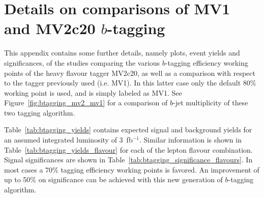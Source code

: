\clearpage 
\section{Details on comparisons of MV1 and MV2c20 $b$-tagging}
\label{app_btagging}

This appendix contains some further details, namely plots, event yields and significances, of the studies comparing the various $b$-tagging efficiency working points of the heavy flavour tagger MV2c20, 
as well as a comparison with respect to the tagger previously used (i.e. MV1).
In this latter case only the default 80\% working point is used, and is simply labeled as MV1. See Figure~\ref{fig:btagging_mv2_mv1} for a comparison of $b$-jet multiplicity of these two tagging algorithm.

Table~\ref{tab:btagging_yields} contains expected signal and background yields for an assumed integrated luminosity of 3~fb$^{-1}$.
Similar information is shown in Table~\ref{tab:btagging_yields_flavour} for each of the lepton flavour combination.
Signal significances are shown in Table~\ref{tab:btagging_significance_flavours}. In most cases a 70\% tagging efficiency working points is favored.
An improvement of up to 50\% on significance can be achieved with this new generation of $b$-tagging algorithm.  


